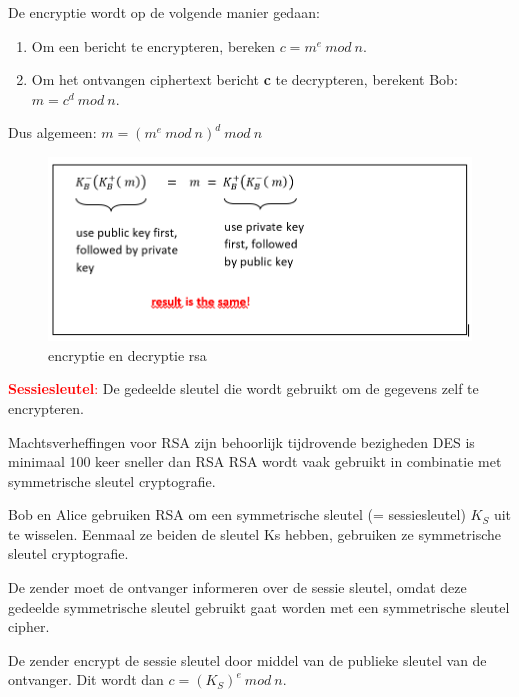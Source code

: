 
De encryptie wordt op de volgende manier gedaan:

\begin{enumerate}
\item Om een bericht te encrypteren, bereken $c = m^e\ mod\ n$.
\item Om het ontvangen ciphertext bericht \textbf{c} te decrypteren, berekent Bob: $m = c^d\ mod\ n$.
\end{enumerate}

\noindent Dus algemeen: $m = (m^e\ mod\ n)^d \ mod\ n$

\begin{figure}[h]
    \centering
    \includegraphics[width=7in]{./img/imghfdst8/diffie.PNG}
    \caption{encryptie en decryptie rsa}      
    \label{fig:encryptie en decryptie rsa }
\end{figure}


\textcolor{red}{\textbf{Sessiesleutel}:} De gedeelde sleutel die wordt gebruikt om de gegevens zelf te encrypteren.

\bi
\itf Machtsverheffingen voor RSA zijn behoorlijk tijdrovende bezigheden
\itf DES is minimaal 100 keer sneller dan RSA
\ei
RSA wordt vaak gebruikt in combinatie met symmetrische sleutel cryptografie.

\noindent Bob en Alice gebruiken RSA om een symmetrische sleutel (= sessiesleutel) $K_S$ uit te wisselen. Eenmaal ze beiden de sleutel Ks hebben, gebruiken ze symmetrische sleutel cryptografie.

\noindent De zender moet de ontvanger informeren over de sessie sleutel, omdat deze gedeelde symmetrische sleutel gebruikt gaat worden met een symmetrische sleutel cipher.

\noindent De zender encrypt de sessie sleutel door middel van de publieke sleutel van de ontvanger. Dit wordt dan $c = (K_S)^e\ mod\ n$.

